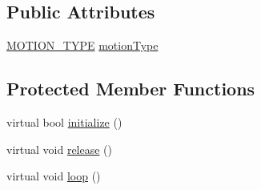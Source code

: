 \subsection*{Public Attributes}
\begin{DoxyCompactItemize}
\item 
\hyperlink{SteppingDemoClient_8h_abd6d177d63e98aa1b4ed4b8329e2a379}{M\+O\+T\+I\+O\+N\+\_\+\+T\+Y\+PE} \hyperlink{classSteppingDemoClient_aa880debbcbed0298ae1769dd8a3f721b}{motion\+Type}
\end{DoxyCompactItemize}
\subsection*{Protected Member Functions}
\begin{DoxyCompactItemize}
\item 
virtual bool \hyperlink{classSteppingDemoClient_a08dce195eece162eed175ac9487667c2}{initialize} ()
\item 
virtual void \hyperlink{classSteppingDemoClient_aafcb227c0d7ce24823957e2331caa88b}{release} ()
\item 
virtual void \hyperlink{classSteppingDemoClient_a37dba4764b5849cf33c395cd0d4b0eb5}{loop} ()
\end{DoxyCompactItemize}
